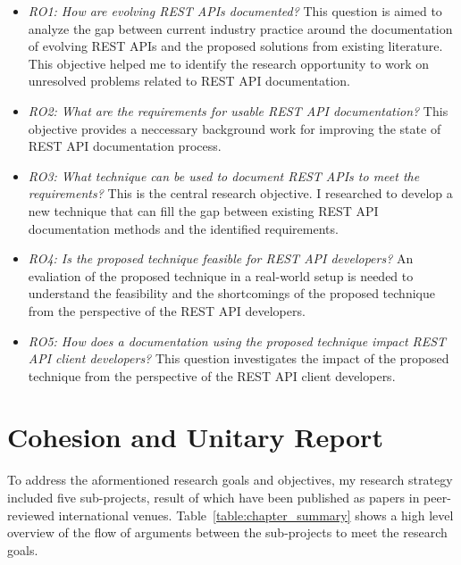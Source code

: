 \begin{itemize}
  \item \textit{RO1: How are evolving REST APIs documented?} This question is aimed to analyze the gap between current industry practice around the documentation of evolving REST APIs and the proposed solutions from existing literature. This objective helped me to identify the research opportunity to work on unresolved problems related to REST API documentation.
  \item \textit{RO2: What are the requirements for usable REST API documentation?} This objective provides a neccessary background work for improving the state of REST API documentation process.
  \item \textit{RO3: What technique can be used to document REST APIs to meet the requirements?} This is the central research objective. I researched to develop a new technique that can fill the gap between existing REST API documentation methods and the identified requirements.
  \item \textit{RO4: Is the proposed technique feasible for REST API developers?} An evaliation of the proposed technique in a real-world setup is needed to understand the feasibility and the shortcomings of the proposed technique from the perspective of the REST API developers.
  \item \textit{RO5: How does a documentation using the proposed technique impact REST API client developers?} This question investigates the impact of the proposed technique from the perspective of the REST API client developers.
\end{itemize}

\section{Cohesion and Unitary Report}
To address the aformentioned research goals and objectives, my research strategy included five sub-projects, result of which have been published as papers in peer-reviewed international venues. Table~\ref{table:chapter_summary} shows a high level overview of the flow of arguments between the sub-projects to meet the research goals.

